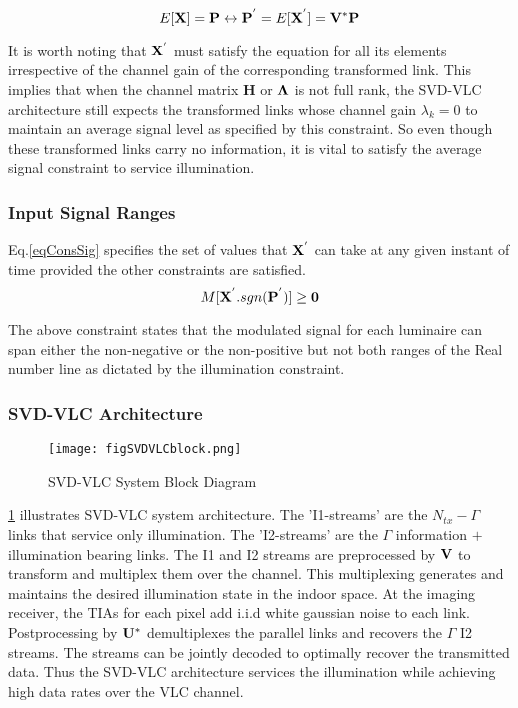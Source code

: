 \begin{equation}
	\label{eqConsIll}
	E[{\bf{X}}] = {\bf{P}} \leftrightarrow {\bf{P}}^{'} = E[{\bf{X}}^{'}] = {\bf{V}}^{*}{\bf{P}}
\end{equation}

It is worth noting that ${\bf{X}}^{'}$ must satisfy the equation for all its elements irrespective of the channel gain of the corresponding transformed link. This implies that when the channel matrix {\bf{H}} or ${\bf{\Lambda}}$ is not full rank, the SVD-VLC architecture still expects the transformed links whose channel gain $\lambda_{k} = 0$ to maintain an average signal level as specified by this constraint. So even though these transformed links carry no information, it is vital to satisfy the average signal constraint to service illumination.

\subsubsection{Input Signal Ranges}
\label{subsubsec:svdvlcSystemRange}

Eq.\ref{eqConsSig} specifies the set of values that ${\bf{X}}^{'}$ can take at any given instant of time provided the other constraints are satisfied.
	\begin{equation}
	\label{eqConsSig}
	M[{\bf{X}}^{'}.sgn({\bf{P}}^{'})] \geq {\bf{0}}
\end{equation}

The above constraint states that the modulated signal for each luminaire can span either the non-negative or the non-positive but not both ranges of the Real number line as dictated by the illumination constraint.

\subsubsection{SVD-VLC Architecture}
\label{subsubsec:svdvlcSystemArchitecture}

\begin{figure}[!t]
	\centering
		\texttt{[image: figSVDVLCblock.png]}
	\caption{SVD-VLC System Block Diagram}
	\label{fig:SVDVLCblock}
\end{figure}

\figurename{ \ref{fig:SVDVLCblock}} illustrates SVD-VLC system architecture. The 'I1-streams' are the $N_{tx} - \Gamma$ links that service only illumination. The 'I2-streams' are the $\Gamma$ information $+$ illumination bearing links. The I1 and I2 streams are preprocessed by ${\bf{V}}$ to transform and multiplex them over the channel. This multiplexing generates and maintains the desired illumination state in the indoor space. At the imaging receiver, the TIAs for each pixel add i.i.d white gaussian noise to each link. Postprocessing by ${\bf{U^{*}}}$ demultiplexes the parallel links and recovers the $\Gamma$ I2 streams. The streams can be jointly decoded to optimally recover the transmitted data. Thus the SVD-VLC architecture services the illumination while achieving high data rates over the VLC channel. 

